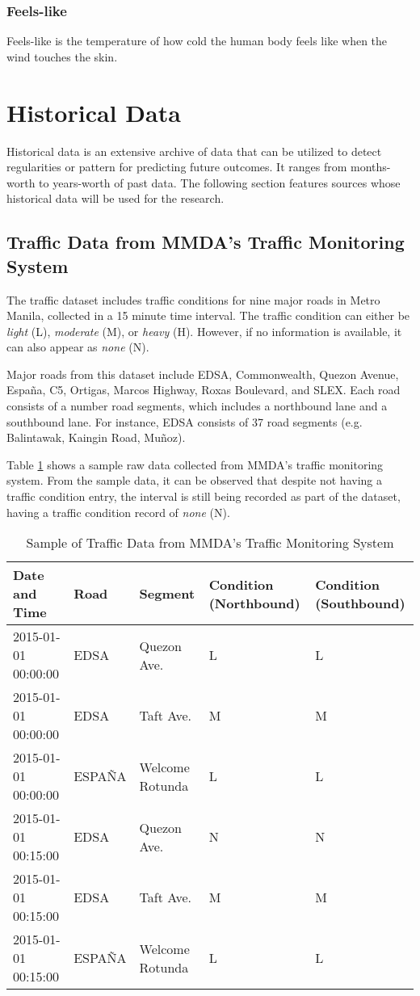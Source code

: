 \subsubsection{Feels-like}
Feels-like is the temperature of how cold the human body feels like when the wind touches the skin.




\section{Historical Data}
Historical data is an extensive archive of data that can be utilized to detect regularities or pattern for predicting future outcomes. It ranges from months-worth to years-worth of past data. The following section features sources whose historical data will be used for the research.

\subsection{Traffic Data from MMDA’s Traffic Monitoring System}
The traffic dataset includes traffic conditions for nine major roads in Metro Manila, collected in a 15 minute time interval. The traffic condition can either be \textit{light} (L), \textit{moderate} (M), or \textit{heavy} (H). However, if no information is available, it can also appear as \textit{none} (N).

Major roads from this dataset include EDSA, Commonwealth, Quezon Avenue, España, C5, Ortigas, Marcos Highway, Roxas Boulevard, and SLEX. Each road consists of a number road segments, which includes a northbound lane and a southbound lane. For instance, EDSA consists of 37 road segments (e.g. Balintawak, Kaingin Road, Muñoz).

Table \ref{table:sample_traffic_data} shows a sample raw data collected from MMDA’s traffic monitoring system. From the sample data, it can be observed that despite not having a traffic condition entry, the interval is still being recorded as part of the dataset, having a traffic condition record of \textit{none} (N).

\begin{table}[h]
	\centering
    \footnotesize
	\caption{Sample of Traffic Data from MMDA's Traffic Monitoring System}
	\label{table:sample_traffic_data}
	\begin{tabular}{|l|l|l|p{2.5cm}|p{2.5cm}|}
		\hline
		Date and Time & Road & Segment & Condition (Northbound) & Condition (Southbound) \\ \hline
		2015-01-01 00:00:00 & EDSA & Quezon Ave. & L & L \\ \hline
		2015-01-01 00:00:00 & EDSA & Taft Ave.& M & M  \\ \hline
		2015-01-01 00:00:00 & ESPAÑA & Welcome Rotunda& L & L  \\ \hline
		2015-01-01 00:15:00 & EDSA & Quezon Ave.& N & N  \\ \hline
		2015-01-01 00:15:00 & EDSA & Taft Ave.& M & M  \\ \hline
		2015-01-01 00:15:00 & ESPAÑA & Welcome Rotunda& L & L  \\ \hline
	\end{tabular}
\end{table}


